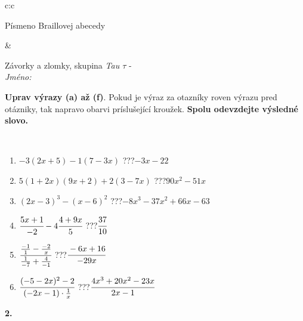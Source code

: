 \documentclass[10pt]{report}
\begin{document}
\begin{tabular}{c:c}
\begin{minipage}[c][104.5mm][t]{0.5\linewidth}
\begin{center}
\begin{minipage}{0.20\linewidth}
\begin{center}
{\small Písmeno Braillovej abecedy}
\end{center}
\end{minipage}
\end{center}
\end{minipage}
&
\begin{minipage}[c][104.5mm][t]{0.5\linewidth}
\begin{center}
\vspace{7mm}
{\huge Závorky a zlomky, skupina \textit{Tau $\tau$} -}\\[5mm]
\textit{Jméno:}\phantom{xxxxxxxxxxxxxxxxxxxxxxxxxxxxxxxxxxxxxxxxxxxxxxxxxxxxxxxxxxxxxxxxx}\\[5mm]
\begin{minipage}{0.95\linewidth}
\begin{center}
\textbf{Uprav výrazy (a) až (f)}. Pokud je výraz za otazníky roven výrazu pred otázniky, tak napravo obarvi príslušející kroužek. \textbf{Spolu odevzdejte výsledné slovo.}
\end{center}
\end{minipage}
\\[1mm]
\begin{minipage}{0.79\linewidth}
\begin{center}
\begin{varwidth}{\linewidth}
\begin{enumerate}
\normalsize
\item $-3(2x+5)-1(7-3x)$\quad \dotfill\; ???\;\dotfill \quad $-3x-22$
\item $5(1+2x)(9x+2)+2(3-7x)$\quad \dotfill\; ???\;\dotfill \quad $90x^2-51x$
\item $(2x-3)^3-(x-6)^2$\quad \dotfill\; ???\;\dotfill \quad $-8x^3-37x^2+66x-63$
\item $\cfrac{5x+1}{-2}-4\cfrac{4+9x}{5}$\quad \dotfill\; ???\;\dotfill \quad $\cfrac{37}{10}$
\item $\cfrac{\frac{-1}{1}-\frac{-2}{x}}{\frac{1}{-7}+\frac{4}{-1}}$\quad \dotfill\; ???\;\dotfill \quad $\cfrac{-6x+16}{-29x}$
\item $\cfrac{(-5-2x)^2-2}{(-2x-1)\cdot\frac{1}{x}}$\quad \dotfill\; ???\;\dotfill \quad $\cfrac{4x^3+20x^2-23x}{2x-1}$
\end{enumerate}
\end{varwidth}
\end{center}
\end{minipage}
\begin{minipage}{0.20\linewidth}
\begin{center}
{\Huge\bfseries 2.} \\[2mm]

\end{center}
\end{minipage}
\end{center}
\end{minipage}
\end{tabular}
\end{document}
